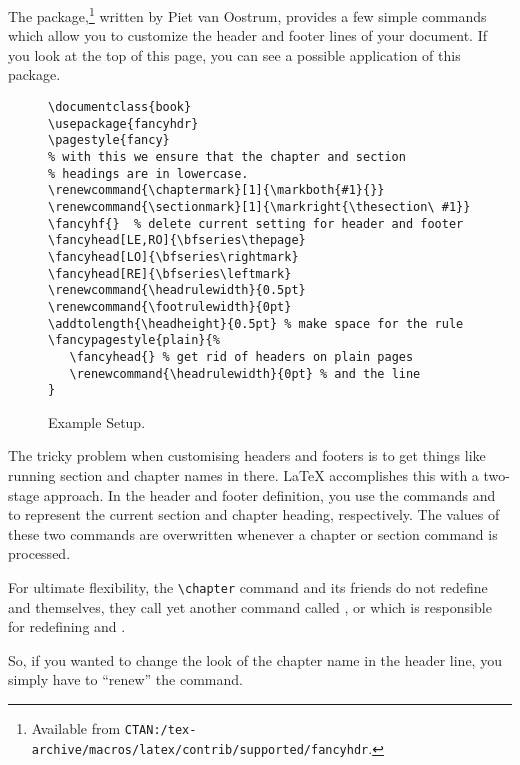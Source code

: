 The  package,\footnote{Available from
  \texttt{CTAN:/tex-archive/macros/latex/contrib/supported/fancyhdr}.} written by
Piet van Oostrum, provides a few simple commands which allow you to
customize the header and footer lines of your document.  If you look
at the top of this page, you can see a possible application of this
package.

\begin{figure}[!htbp]
\begin{lined}{\textwidth}
\begin{verbatim}
\documentclass{book}
\usepackage{fancyhdr}
\pagestyle{fancy}
% with this we ensure that the chapter and section
% headings are in lowercase.
\renewcommand{\chaptermark}[1]{\markboth{#1}{}}
\renewcommand{\sectionmark}[1]{\markright{\thesection\ #1}}
\fancyhf{}  % delete current setting for header and footer
\fancyhead[LE,RO]{\bfseries\thepage}
\fancyhead[LO]{\bfseries\rightmark}
\fancyhead[RE]{\bfseries\leftmark}
\renewcommand{\headrulewidth}{0.5pt}
\renewcommand{\footrulewidth}{0pt}
\addtolength{\headheight}{0.5pt} % make space for the rule
\fancypagestyle{plain}{%
   \fancyhead{} % get rid of headers on plain pages
   \renewcommand{\headrulewidth}{0pt} % and the line
}
\end{verbatim}
\end{lined}
\caption{Example  Setup.} \label{fancyhdr}
\end{figure}

The tricky problem when customising headers and footers is to get
things like running section and chapter names in there. \LaTeX{}
accomplishes this with a two-stage approach. In the header and footer
definition, you use the commands  and  to
represent the current section and chapter heading, respectively.
The values of these two commands are overwritten whenever a chapter or
section command is processed. 

For ultimate flexibility, the \verb|\chapter| command and its friends
do not redefine  and  themselves, they call
yet another command called ,  or
 which is responsible for redefining 
and .

So, if you wanted to change the look of the chapter
name in the header line, you simply have to ``renew'' the 
command. 


